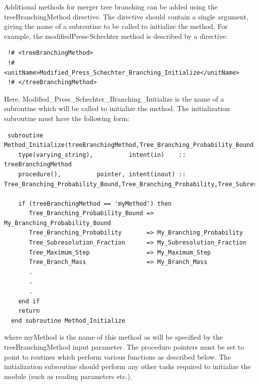 Additional methods for merger tree branching can be added using the {\normalfont \ttfamily treeBranchingMethod} directive. The directive should contain a single argument, giving the name of a subroutine to be called to initialize the method. For example, the {\normalfont \ttfamily modifiedPress-Schechter} method is described by a directive:
\begin{verbatim}
 !# <treeBranchingMethod>
 !#  <unitName>Modified_Press_Schechter_Branching_Initialize</unitName>
 !# </treeBranchingMethod>
\end{verbatim}
Here, {\normalfont \ttfamily Modified\_Press\_Schechter\_Branching\_Initialize} is the name of a subroutine which will be called to initialize the method. The initialization subroutine must have the following form:
\begin{verbatim}
 subroutine Method_Initialize(treeBranchingMethod,Tree_Branching_Probability_Bound,Tree_Branching_Probability,Tree_Subresolution_Fraction,Tree_Branch_Mass,Tree_Maximum_Step)
    type(varying_string),          intent(in)    :: treeBranchingMethod
    procedure(),          pointer, intent(inout) :: Tree_Branching_Probability_Bound,Tree_Branching_Probability,Tree_Subresolution_Fraction,Tree_Branch_Mass,Tree_Maximum_Step
    
    if (treeBranchingMethod == 'myMethod') then
       Tree_Branching_Probability_Bound => My_Branching_Probability_Bound
       Tree_Branching_Probability       => My_Branching_Probability
       Tree_Subresolution_Fraction      => My_Subresolution_Fraction
       Tree_Maximum_Step                => My_Maximum_Step
       Tree_Branch_Mass                 => My_Branch_Mass
       .
       .
       .
    end if
    return
  end subroutine Method_Initialize
\end{verbatim}
where {\normalfont \ttfamily myMethod} is the name of this method as will be specified by the {\normalfont \ttfamily treeBranchingMethod} input parameter. The procedure pointers must be set to point to routines which perform various functions as described below. The initialization subroutine should perform any other tasks required to initialize the module (such as reading parameters etc.).

